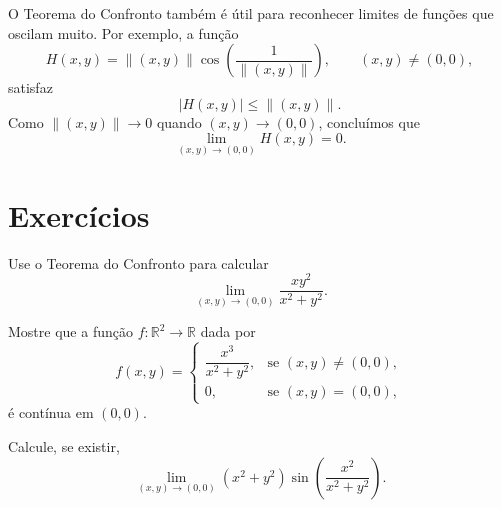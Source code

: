 \begin{example}
    O Teorema do Confronto também é útil para reconhecer limites de funções que oscilam muito.
    Por exemplo, a função
    \[
        H(x,y)=\|(x,y)\|\cos\left(\frac{1}{\|(x,y)\|}\right),
        \qquad (x,y)\neq(0,0),
    \]
    satisfaz
    \[
        |H(x,y)|\leq \|(x,y)\|.
    \]
    Como $\|(x,y)\|\to 0$ quando $(x,y)\to(0,0)$, concluímos que
    \[
        \lim_{(x,y)\to(0,0)}H(x,y)=0.
    \]
\end{example}

\section*{Exercícios}

\begin{exercise}
    Use o Teorema do Confronto para calcular
    \[
        \lim_{(x,y)\to(0,0)}\frac{xy^2}{x^2+y^2}.
    \]
\end{exercise}

\begin{exercise}
    Mostre que a função $f:\mathbb R^2\to\mathbb R$ dada por
    \[
        f(x,y)=
        \begin{cases}
            \dfrac{x^3}{x^2+y^2}, & \text{se }(x,y)\neq(0,0),\\
            0, & \text{se }(x,y)=(0,0),
        \end{cases}
    \]
    é contínua em $(0,0)$.
\end{exercise}

\begin{exercise}
    Calcule, se existir,
    \[
        \lim_{(x,y)\to(0,0)}(x^2+y^2)\sin\left(\frac{x^2}{x^2+y^2}\right).
    \]
\end{exercise}
